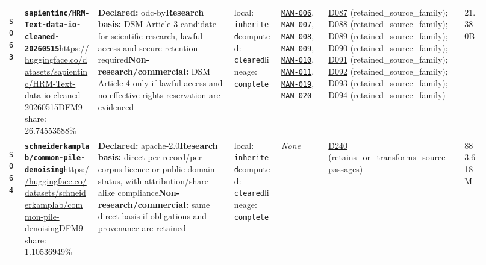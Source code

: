 \documentclass[9pt,a4paper]{article}
\newcommand{\srcid}[1]{\hypertarget{src:#1}{\texttt{#1}}}
\begin{document}
\begin{landscape}
\begin{longtable}{@{}L{0.03\linewidth}L{0.14\linewidth}L{0.26\linewidth}L{0.09\linewidth}L{0.09\linewidth}L{0.265\linewidth}L{0.045\linewidth}@{}}
\srcid{S063} & \textbf{\nolinkurl{sapientinc/HRM-Text-data-io-cleaned-20260515}}\newline \url{https://huggingface.co/datasets/sapientinc/HRM-Text-data-io-cleaned-20260515}\newline DFM9 share: 26.74553588\% & \textbf{Declared:} odc-by\newline \textbf{Research basis:} DSM Article 3 candidate for scientific research, lawful access and secure retention required\newline \textbf{Non-research/commercial:} DSM Article 4 only if lawful access and no effective rights reservation are evidenced & local: \texttt{inherited}\newline computed: \texttt{cleared}\newline lineage: \texttt{complete} & \hyperlink{manual:MAN-006}{\texttt{MAN-006}}, \hyperlink{manual:MAN-007}{\texttt{MAN-007}}, \hyperlink{manual:MAN-008}{\texttt{MAN-008}}, \hyperlink{manual:MAN-009}{\texttt{MAN-009}}, \hyperlink{manual:MAN-010}{\texttt{MAN-010}}, \hyperlink{manual:MAN-011}{\texttt{MAN-011}}, \hyperlink{manual:MAN-019}{\texttt{MAN-019}}, \hyperlink{manual:MAN-020}{\texttt{MAN-020}} & \hyperlink{dep:D087}{D087} (retained\_source\_family); \hyperlink{dep:D088}{D088} (retained\_source\_family); \hyperlink{dep:D089}{D089} (retained\_source\_family); \hyperlink{dep:D090}{D090} (retained\_source\_family); \hyperlink{dep:D091}{D091} (retained\_source\_family); \hyperlink{dep:D092}{D092} (retained\_source\_family); \hyperlink{dep:D093}{D093} (retained\_source\_family); \hyperlink{dep:D094}{D094} (retained\_source\_family) & 21.380B \\
\srcid{S064} & \textbf{\nolinkurl{schneiderkamplab/common-pile-denoising}}\newline \url{https://huggingface.co/datasets/schneiderkamplab/common-pile-denoising}\newline DFM9 share: 1.10536949\% & \textbf{Declared:} apache-2.0\newline \textbf{Research basis:} direct per-record/per-corpus licence or public-domain status, with attribution/share-alike compliance\newline \textbf{Non-research/commercial:} same direct basis if obligations and provenance are retained & local: \texttt{inherited}\newline computed: \texttt{cleared}\newline lineage: \texttt{complete} & \textit{None} & \hyperlink{dep:D240}{D240} (retains\_or\_transforms\_source\_passages) & 883.618M \\

\end{longtable}
\end{landscape}
\end{document}
